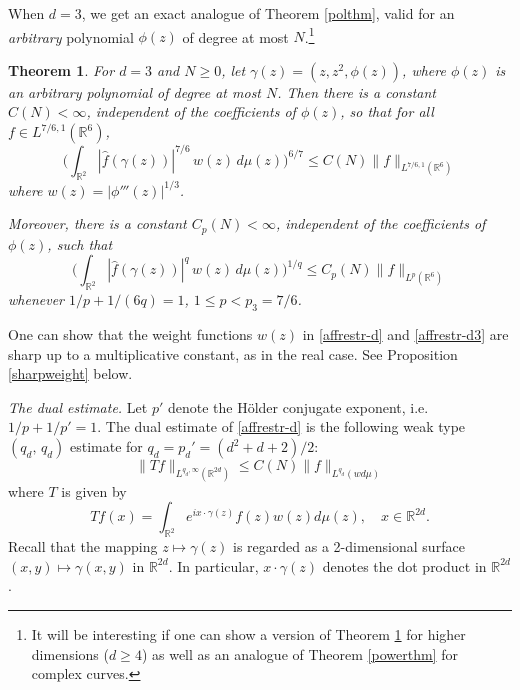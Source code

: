 \documentclass[11 pt]{amsart}
\theoremstyle{plain}
\newtheorem{theorem}{Theorem}[section]
\numberwithin{equation}{section}
\theoremstyle{plain}
\numberwithin{equation}{section}
\theoremstyle{remark}
\begin{document}
When $d=3$, we get an exact analogue of Theorem \ref{polthm}, valid for an {\it arbitrary} polynomial $\phi(z)$ of degree at most $N$.\footnote{It will be interesting if one can show a version of Theorem \ref{comppolthm} for higher dimensions ($d\ge 4$) as well as an analogue of Theorem \ref{powerthm} for complex curves.}
\begin{theorem} \label{comppolthm}
For $d = 3$ and $N\ge 0$, let $\gamma(z)=(z, z^2, \phi(z))$, where $\phi(z)$ is an arbitrary polynomial of degree at most $N$. Then there is a constant $C(N)<\infty$, independent of the coefficients of $\phi(z)$, so that for all $f\in L^{7/6,1}({{\mathbb {R}}}^{6})$,
\begin{equation} \label{affrestr-d3}
\Big(\int_{{{\mathbb {R}}}^2}
 |\widehat f (\gamma(z) )|^{7/6} \,w(z) \, d\mu(z)\Big)^{6/7} \le
C(N)\|f\|_{L^{7/6 ,1}({{\mathbb {R}}}^{6})}
\end{equation}
where $w(z) = |\phi''' (z)|^{1/3}$.

Moreover, there is a constant $C_p (N) <\infty$, independent of the coefficients of $\phi(z)$, such that
\begin{equation*} \label{affrestr-dpq}
\Big(\int_{{{\mathbb {R}}}^2}
 |\widehat f (\gamma(z) )|^{q} \,w(z) \, d\mu(z)\Big)^{1/q} \le
C_p (N) \|f\|_{L^{p}({{\mathbb {R}}}^{6})}
\end{equation*}
whenever $1/p+ 1/(6q) = 1$, $1\le p< p_3 = 7/6$.
\end{theorem}

One can show that the weight functions $w(z)$ in \eqref{affrestr-d} and \eqref{affrestr-d3} are sharp up to a multiplicative constant, as in the real case.
See Proposition \ref{sharpweight} below.

\medskip

{\sl The dual estimate.}
Let $p'$ denote the H\"older conjugate exponent, i.e. $1/p+1/p'=1$. The dual estimate of \eqref{affrestr-d} is the following weak type $(q_d, \,q_d)$
estimate for $q_d = p_d' = (d^2+d+2)/2$:
\begin{equation}\label{T-Q}
\| T f\|_{L^{q_d,\infty}({{\mathbb {R}}}^{2d})} \le C(N) \| f\|_{L^{q_d}(w d\mu )}
\end{equation}
where $T$ is given by
\begin{equation*}\label{T}
T f(x)=  \int_{{{\mathbb {R}}}^2} e^{i x\cdot \gamma(z)} f(z) w(z) d\mu(z),
\quad x\in {{\mathbb {R}}}^{2d} .
\end{equation*}
Recall that the mapping $z\mapsto \gamma(z)$ is regarded as a
2-dimensional surface $(x,y)\mapsto \gamma(x,y)$ in ${{\mathbb {R}}}^{2d}$. In
particular, $x\cdot \gamma(z)$ denotes the dot product in
${{\mathbb {R}}}^{2d}$.
\end{document}
